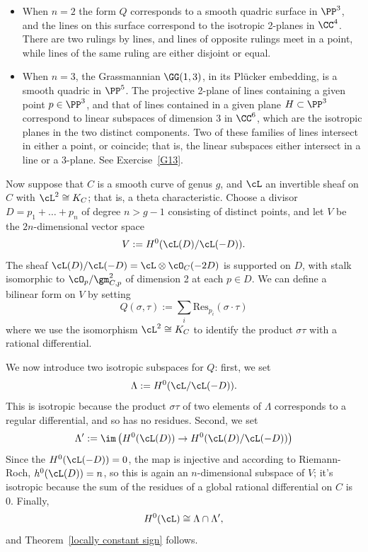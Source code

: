 \begin{example}
\begin{itemize}

\item When $n=2$ the form $Q$ corresponds to a smooth quadric surface in $\PP^3$, and the lines on this surface correspond to the isotropic 2-planes in $\CC^4$. There are two rulings by lines, and lines of opposite rulings meet in a point, while lines of the same ruling are either disjoint or equal. 

\item When $n=3$, the Grassmannian $\GG(1,3)$, in its Pl\"ucker embedding, is a smooth quadric in $\PP^5$. The projective 2-plane of lines containing a given point $p \in \PP^3$, and that of lines contained in a given plane $H \subset \PP^3$
correspond to linear subspaces of dimension 3 in $\CC^6$, which are the isotropic planes in the two distinct components. Two of these families of lines intersect in either a point, or coincide; that is, the linear subspaces either intersect  in a line or a 3-plane. See Exercise~\ref{G13}.

\end{itemize}
\end{example}


Now suppose that $C$ is a smooth curve of genus $g$, and $\cL$ an invertible sheaf on $C$ with $\cL^2 \cong K_C$; that is, a theta characteristic. Choose a divisor $D = p_1 + \dots + p_n$ of degree $n> g-1$ consisting of distinct points, and let $V$ be the $2n$-dimensional vector space
$$
V := H^0( \cL(D) / \cL(-D) ).
$$
The sheaf $ \cL(D) / \cL(-D) = \cL \otimes \cO_C(-2D) $ is supported on $D$, with stalk 
isomorphic to $\cO_p/\gm_{C,p}^2$ of dimension 2 at each $p \in D$. We can define a bilinear form on $V$ by setting
$$
Q(\sigma, \tau) := \sum_i \text{Res}_{p_i}(\sigma \cdot \tau)
$$
where we use the isomorphism $\cL^2 \cong K_C$ to identify the product $\sigma\tau$ with a rational differential.

We now introduce two isotropic subspaces for $Q$: first, we set
$$
\Lambda := H^0( \cL / \cL(-D) ).
$$
This is isotropic because the product $\sigma\tau$ of two elements of $\Lambda$ corresponds to a regular differential, and so has no residues.  Second, we set
$$
\Lambda' := \im\left( H^0(\cL(D)) \to H^0( \cL(D) / \cL(-D) ) \right)
$$
Since the $H^0(\cL(-D)) = 0$, the map is injective and according to Riemann-Roch, $h^0(\cL(D)) = n$, so this is again an $n$-dimensional subspace of $V$; it's isotropic because the sum of the residues of a global rational differential on $C$ is 0. Finally, 
$$
H^0(\cL) \cong \Lambda \cap \Lambda',
$$
and Theorem~\ref{locally constant sign} follows.

